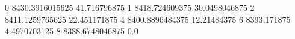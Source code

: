 0 8430.3916015625 41.716796875
1 8418.724609375 30.0498046875
2 8411.1259765625 22.451171875
4 8400.8896484375 12.21484375
6 8393.171875 4.4970703125
8 8388.6748046875 0.0
